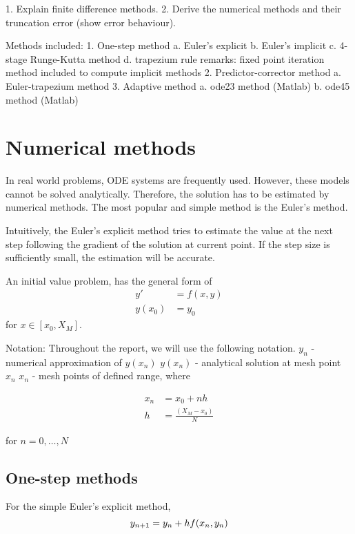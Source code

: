 1. Explain finite difference methods.
2. Derive the numerical methods and their truncation error (show error behaviour).

Methods included:
1. One-step method
    a. Euler's explicit
    b. Euler's implicit
    c. 4-stage Runge-Kutta method
    d. trapezium rule
    remarks: fixed point iteration method included to compute implicit methods
2. Predictor-corrector method
    a. Euler-trapezium method
3. Adaptive method
    a. ode23 method (Matlab)
    b. ode45 method (Matlab)
    
\chapter{Numerical methods}
\label{chap:numerical-methods}
In real world problems, ODE systems are frequently used. However, these models cannot be solved analytically. Therefore, the solution has to be estimated by numerical methods. The most popular and simple method is the Euler's method.

Intuitively, the Euler's explicit method tries to estimate the value at the next step following the gradient of the solution at current point. If the step size is sufficiently small, the estimation will be accurate.

An initial value problem, has the general form of 
\begin{align}
    y'&=f(x,y)\\
    y(x_0) &= y_0
\end{align}
for $x \in [x_0, X_M]$.

Notation:
Throughout the report, we will use the following notation.
$y_n$ - numerical approximation of $y(x_n)$
$y(x_n)$ - analytical solution at mesh point $x_n$
$x_n$ - mesh points of defined range, where

\begin{align}
    x_n &= x_0 + nh\\
    h &= \frac{(X_M - x_0)}{N}
\end{align}

for $n = 0,\dots, N$

\section{One-step methods}
For the simple Euler's explicit method, 
\begin{equation}
    y_{n+1} = y_n + hf(x_n,y_n)\\
\end{equation}

